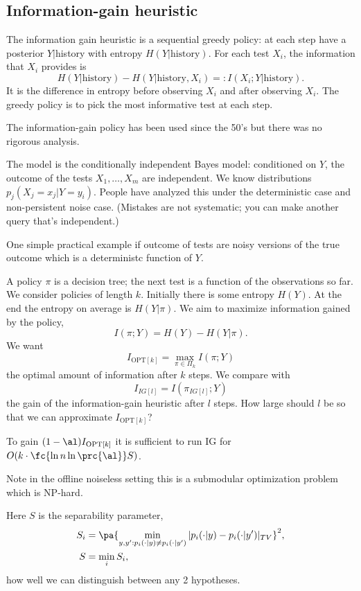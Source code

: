 \subsection{Information-gain heuristic}

The information gain heuristic is a sequential greedy policy: at each step have a posterior $Y|$history with entropy $H(Y|\text{history})$. For each test $X_i$, the information that $X_i$ provides is
$$
H(Y|\text{history}) - H(Y|\text{history},X_i) =: I(X_i;Y|\text{history}). 
$$
It is the difference in entropy before observing $X_i$ and after observing $X_i$. The greedy policy is to pick the most informative test at each step.

The information-gain policy has been used since the 50's but there was no rigorous analysis.

The model is the conditionally independent Bayes model: conditioned on $Y$, the outcome of the tests $X_1,\ldots, X_m$ are independent.
We know distributions $p_j(X_j=x_j|Y=y_i)$. 
People have analyzed this under the deterministic case and non-persistent noise case. (Mistakes are not systematic; you can make another query that's independent.)

One simple practical example if outcome of tests are noisy versions of the true outcome which is a deterministc function of $Y$.

A policy $\pi$ is a decision tree; the next test is a function of the observations so far. We consider policies of length $k$. 
Initially there is some entropy $H(Y)$. At the end the  entropy on average is $H(Y|\pi)$. We aim to maximize information gained by the policy, 
$$I(\pi;Y) = H(Y) - H(Y|\pi).$$
We want
$$
I_{\text{OPT}[k]} = \max_{\pi\in \Pi_k}I(\pi;Y)
$$
the optimal amount of information after $k$ steps.
We compare with
$$
I_{IG[l]} = I(\pi_{IG[l]};Y)
$$
the gain of the information-gain heuristic after $l$ steps.
How large should $l$ be so that we can approximate $I_{\text{OPT}[k]}$?

\begin{thm}
To gain $(1-\al)I_{\text{OPT}[k]}$ it is sufficient to run IG for $O(k\cdot \fc{\ln n\ln \prc{\al}}S)$.
\end{thm}

Note in the offline noiseless setting this is a submodular optimization problem which is NP-hard.

Here $S$ is the separability parameter,
\begin{align}
S_i &= \pa{\min_{y,y':p_i(\cdot|y)\ne p_i(\cdot |y')} |p_i(\cdot|y)-p_i(\cdot |y')|_{TV}}^2,\\
S&=\min_i S_i,
\end{align}
how well we can distinguish between any 2 hypotheses.

